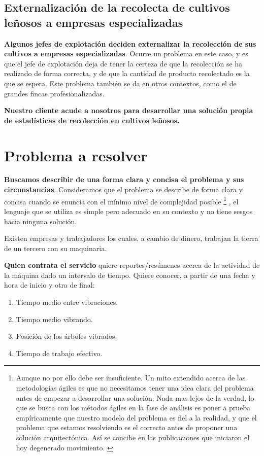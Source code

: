 \subsection{Externalización de la recolecta de cultivos leñosos a empresas especializadas}

\textbf{Algunos jefes de explotación deciden externalizar la recolección
de sus cultivos a empresas especializadas}. Ocurre un problema en este
caso, y es que el jefe de explotación deja de tener la certeza de que la
recolección se ha realizado de forma correcta, y de que la cantidad de producto
recolectado es la que se espera. Este problema también se da en otros contextos,
como el de grandes fincas profesionalizadas.

\textbf{Nuestro cliente acude a nosotros para desarrollar una solución propia de
estadísticas de recolección en cultivos leñosos.}

\section{Problema a resolver} \label{sec:problema_a_resolver}

\textbf{Buscamos describir de una forma clara y concisa el problema y sus
circunstancias}. Consideramos que el problema se describe de forma clara y
concisa cuando se enuncia con el mínimo nivel de complejidad posible%
%
\footnote{Aunque
no por ello debe ser insuficiente. Un mito extendido acerca de las metodologías ágiles
es que no necesitamos tener una idea clara del problema antes de empezar a desarrollar
una solución. Nada mas lejos de la verdad, lo que se busca con los métodos ágiles en la
fase de análisis es poner a prueba empíricamente que nuestro modelo del problema es fiel
a la realidad, y que el problema que estamos resolviendo es el correcto antes de proponer
una solución arquitectónica. Así se concibe en las publicaciones que iniciaron el hoy
degenerado movimiento. \cite{AgileBackToBasics}
}%
, el lenguaje que se utiliza es simple pero adecuado
en su contexto y no tiene sesgos hacia ninguna solución.

Existen empresas y trabajadores los cuales, a cambio de dinero, trabajan la
tierra de un tercero con su maquinaria.

\textbf{Quien contrata el servicio} quiere reportes/resúmenes acerca de la actividad
de la máquina dado un intervalo de tiempo. Quiere conocer, a partir de una fecha y hora de inicio y otra de final:

\begin{enumerate}
   \item Tiempo medio entre vibraciones.
   \item Tiempo medio vibrando.
   \item Posición de los árboles vibrados.
   \item Tiempo de trabajo efectivo.
\end{enumerate}

